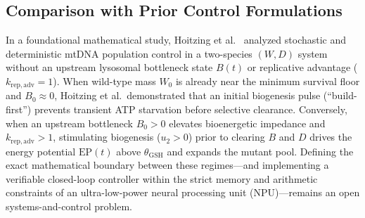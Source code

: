 \documentclass[11pt]{article}
\theoremstyle{plain}
\theoremstyle{remark}
\begin{document}
\subsection{Comparison with Prior Control Formulations}
In a foundational mathematical study, Hoitzing et al.~\cite{hoitzing2019energetic} analyzed stochastic and deterministic mtDNA population control in a two-species $(W, D)$ system without an upstream lysosomal bottleneck state $B(t)$ or replicative advantage ($k_{\mathrm{rep,adv}} = 1$). When wild-type mass $W_0$ is already near the minimum survival floor and $B_0 \approx 0$, Hoitzing et al.\ demonstrated that an initial biogenesis pulse (``build-first'') prevents transient ATP starvation before selective clearance. Conversely, when an upstream bottleneck $B_0 > 0$ elevates bioenergetic impedance and $k_{\mathrm{rep,adv}} > 1$, stimulating biogenesis ($u_2 > 0$) prior to clearing $B$ and $D$ drives the energy potential $\mathrm{EP}(t)$ above $\theta_{\mathrm{GSH}}$ and expands the mutant pool. Defining the exact mathematical boundary between these regimes---and implementing a verifiable closed-loop controller within the strict memory and arithmetic constraints of an ultra-low-power neural processing unit (NPU)---remains an open systems-and-control problem.
\end{document}
